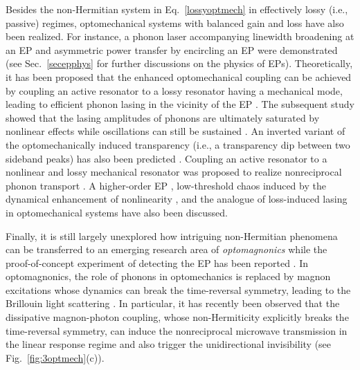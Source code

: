 \documentclass{tADP2e}
\theoremstyle{plain}
\theoremstyle{plain}
\theoremstyle{definition}
\begin{document}
Besides the non-Hermitian system in Eq.~\eqref{lossyoptmech} in effectively lossy (i.e., passive) regimes,  optomechanical systems with balanced gain and loss have also been realized. For instance, a phonon laser accompanying linewidth broadening at an EP \cite{ZJ18} and asymmetric power transfer by encircling an EP were demonstrated \cite{HX2016} (see {Sec.~\ref{secepphys}} for further discussions on the physics of EPs).  
Theoretically, it has been proposed that the enhanced optomechanical coupling can be achieved by coupling an active resonator to a lossy resonator having a mechanical mode, leading to efficient phonon lasing in the vicinity of the EP \cite{HJ14}. The subsequent study showed that the lasing amplitudes of phonons are ultimately saturated by nonlinear effects while oscillations can  still be sustained \cite{DWS16,KVK16}.
An inverted variant of the optomechanically induced transparency (i.e., a transparency dip between two sideband peaks)  has also been predicted \cite{JH15}. 
Coupling an active resonator to a nonlinear and lossy mechanical resonator was proposed to realize nonreciprocal phonon transport \cite{ZJ152}. A higher-order EP \cite{JH17},  low-threshold chaos induced by the dynamical enhancement of nonlinearity \cite{LXY15}, and the analogue of loss-induced lasing in optomechanical systems \cite{LH17}  have also been discussed. 

Finally, it is still largely unexplored how intriguing non-Hermitian phenomena can be transferred to an emerging research area of {\it optomagnonics} while the proof-of-concept experiment of detecting the EP has been reported \cite{ZD17}. 
In optomagnonics, the role of phonons in optomechanics is replaced by magnon excitations  whose dynamics can break the time-reversal symmetry, leading to the Brillouin light scattering \cite{OsA16,OsA18}. In particular, it has recently been observed that the dissipative magnon-photon coupling, whose non-Hermiticity explicitly breaks the time-reversal symmetry, can induce the nonreciprocal microwave transmission in the linear response regime and also trigger the unidirectional invisibility  \cite{WYP19} (see Fig.~\ref{fig:3optmech}(c)).
\end{document}

